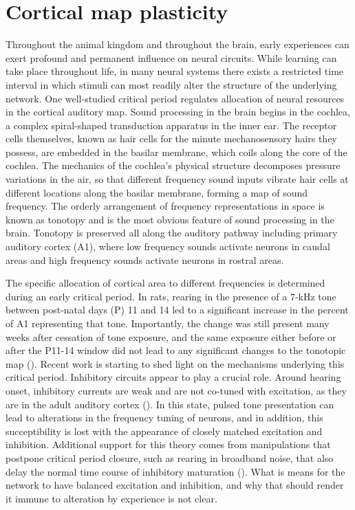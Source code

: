 \section{Cortical map plasticity}

Throughout the animal kingdom and throughout the brain, early experiences can exert profound and permanent influence on neural circuits. While learning can take place throughout life, in many neural systems there exists a restricted time interval in which stimuli can most readily alter the structure of the underlying network. One well-studied critical period regulates allocation of neural resources in the cortical auditory map. Sound processing in the brain begins in the cochlea, a complex spiral-shaped transduction apparatus in the inner ear. The receptor cells themselves, known as hair cells for the minute mechanosensory hairs they possess, are embedded in the basilar membrane, which coils along the core of the cochlea. The mechanics of the cochlea's physical structure decomposes pressure variations in the air, so that different frequency sound inputs vibrate hair cells at different locations along the basilar membrane, forming a map of sound frequency. The orderly arrangement of frequency representations in space is known as tonotopy and is the most obvious feature of sound processing in the brain. Tonotopy is preserved all along the auditory pathway including primary auditory cortex (A1), where low frequency sounds activate neurons in caudal areas and high frequency sounds activate neurons in rostral areas.

The specific allocation of cortical area to different frequencies is determined during an early critical period. In rats, rearing in the presence of a 7-kHz tone between post-natal days (P) 11 and 14 led to a significant increase in the percent of A1 representing that tone. Importantly, the change was still present many weeks after cessation of tone exposure, and the same exposure either before or after the P11-14 window did not lead to any significant changes to the tonotopic map (\cite{DeVillers-Sidani2007}). Recent work is starting to shed light on the mechanisms underlying this critical period. Inhibitory circuits appear to play a crucial role. Around hearing onset, inhibitory currents are weak and are not co-tuned with excitation, as they are in the adult auditory cortex (\cite{Dorrn2010}). In this state, pulsed tone presentation can lead to alterations in the frequency tuning of neurons, and in addition, this succeptibility is lost with the appearance of closely matched excitation and inhibition. Additional support for this theory comes from manipulations that postpone critical period closure, such as rearing in broadband noise, that also delay the normal time course of inhibitory maturation (\cite{DeVillers-Sidani2008}). What is means for the network to have balanced excitation and inhibition, and why that should render it immune to alteration by experience is not clear.

